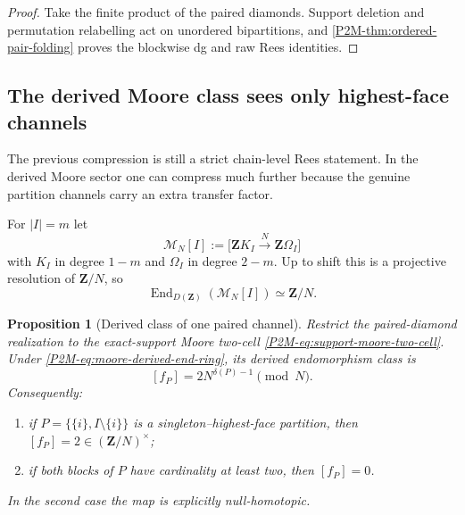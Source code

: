 \documentclass[11pt]{article}
\newtheorem{proposition}[theorem]{Proposition}
\theoremstyle{remark}
\newcommand{\Z}{\mathbf Z}
\begin{document}
\begin{proof}
Take the finite product of the paired diamonds.  Support deletion and
permutation relabelling act on unordered bipartitions, and
\cref{P2M-thm:ordered-pair-folding} proves the blockwise dg and raw Rees identities.
\end{proof}

\subsection{The derived Moore class sees only highest-face channels}

The previous compression is still a strict chain-level Rees statement.  In
the derived Moore sector one can compress much further because the genuine
partition channels carry an extra transfer factor.

For $|I|=m$ let
\begin{equation}
 \mathcal M_N[I]
 :=\bigl[\Z K_I\xrightarrow{\ N\ }\Z\Omega_I\bigr]
 \label{P2M-eq:support-moore-two-cell}
\end{equation}
with $K_I$ in degree $1-m$ and $\Omega_I$ in degree $2-m$.  Up to shift this
is a projective resolution of $\Z/N$, so
\begin{equation}
 \boxed{
 \operatorname{End}_{D(\Z)}(\mathcal M_N[I])\simeq\Z/N.}
 \label{P2M-eq:moore-derived-end-ring}
\end{equation}

\begin{proposition}[Derived class of one paired channel]
\label{P2M-prop:paired-channel-derived-class}
Restrict the paired-diamond realization to the exact-support Moore two-cell
\eqref{P2M-eq:support-moore-two-cell}.  Under
\eqref{P2M-eq:moore-derived-end-ring}, its derived endomorphism class is
\begin{equation}
 \boxed{
 [f_P]=2N^{\delta(P)-1}\pmod N.}
 \label{P2M-eq:paired-derived-scalar}
\end{equation}
Consequently:
\begin{enumerate}[label=\textup{(\roman*)}]
\item if $P=\{\{i\},I\setminus\{i\}\}$ is a singleton--highest-face
      partition, then $[f_P]=2\in(\Z/N)^\times$;
\item if both blocks of $P$ have cardinality at least two, then $[f_P]=0$.
\end{enumerate}
In the second case the map is explicitly null-homotopic.
\end{proposition}
\end{document}
